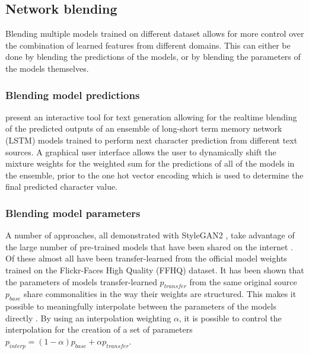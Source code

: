 \subsection{Network blending}
\label{survey:blending}

Blending multiple models trained on different dataset allows for more control over the combination of learned features from different domains. 
This can either be done by blending the predictions of the models, or by blending the parameters of the models themselves.

\subsubsection{Blending model predictions} 

\citet{akten2016real} present an interactive tool for text generation allowing for the realtime blending of the predicted outputs of an ensemble of long-short term memory network (LSTM) models \citep{hochreiter1997long} trained to perform next character prediction from different text sources. 
A graphical user interface allows the user to dynamically shift the mixture weights for the weighted sum for the predictions of all of the models in the ensemble, prior to the one hot vector encoding which is used to determine the final predicted character value.


\subsubsection{Blending model parameters} 
A number of approaches, all demonstrated with StyleGAN2 \citep{karras2019analyzing}, take advantage of the large number of pre-trained models that have been shared on the internet \citep{pinkney2020awesome}. 
Of these almost all have been transfer-learned from the official model weights trained on the Flickr-Faces High Quality (FFHQ) dataset.
It has been shown that the parameters of models transfer-learned $p_{transfer}$ from the same original source $p_{base}$ share commonalities in the way their weights are structured. 
This makes it possible to meaningfully interpolate between the parameters of the models directly \citep{aydao2020interp}. 
By using an interpolation weighting $\alpha$, it is possible to control the interpolation for the creation of a set of parameters $p_{interp} = (1 - \alpha)p_{base} + \alpha p_{transfer}$. 

